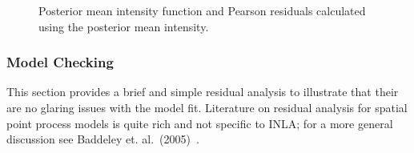 \documentclass[]{interact}
\begin{document}
\begin{figure}[p]



\caption{Posterior mean intensity function and Pearson residuals calculated
using the posterior mean intensity.}
\label{beiintensity}
\end{figure}


\subsubsection{Model Checking}
\label{beiresid}

This section provides a brief and simple residual analysis to illustrate that
their are no glaring issues with the model fit. Literature on residual analysis
for spatial point process models is quite rich and not specific to INLA; for a
more general discussion see Baddeley et. al.~(2005)~\cite{baddeleyresiduals}.
\end{document}
